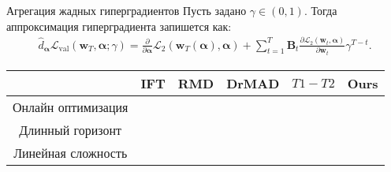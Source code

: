 \documentclass[aspectratio=169]{beamer}
\def\lval{\mathcal{L}_{\mathrm{val}}}
\newcommand{\vect}[1]{\boldsymbol{\mathbf{#1}}}
\begin{document}
\begin{frame}{Агрегация жадных гиперградиентов}
  Пусть задано $\gamma \in (0, 1)$. Тогда аппроксимация гиперградиента запишется как:
  \begin{align*}
    \hat{d}_{\boldsymbol{\alpha}}\lval(\vect{w}_T, \vect{\alpha}; \gamma) = \frac{\partial}{\partial \boldsymbol{\alpha}}\mathcal{L}_2(\mathbf{w}_T(\boldsymbol{\alpha}), \boldsymbol{\alpha}) +
    \sum_{t=1}^T \mathbf{B}_t\frac{\partial\mathcal{L}_2(\mathbf{w}_t, \boldsymbol{\alpha})}{\partial \mathbf{w}_t}\gamma^{T-t}.
  \end{align*}
  \begin{table}
    \begin{tabular}{c|c|c|c|c|c} \toprule
       & IFT & RMD & DrMAD & $T1-T2$ & Ours \\ \midrule
      Онлайн оптимизация & \color{dark_red}{\texttimes} & \color{dark_green}{\checkmark} & \color{dark_red}{\texttimes} & \color{dark_green}{\checkmark} & \color{dark_green}{\checkmark} \\
      Длинный горизонт & \color{dark_green}{\checkmark} & \color{dark_green}{\checkmark} & \color{dark_green}{\checkmark} & \color{dark_red}{\texttimes} & \color{dark_green}{\checkmark} \\
      Линейная сложность & \color{dark_green}{\checkmark} & \color{dark_red}{\texttimes} & \color{dark_green}{\checkmark} & \color{dark_green}{\checkmark} & \color{dark_green}{\checkmark} \\ \bottomrule
      
    \end{tabular}
  \end{table}
  
\end{frame}







\end{document}
